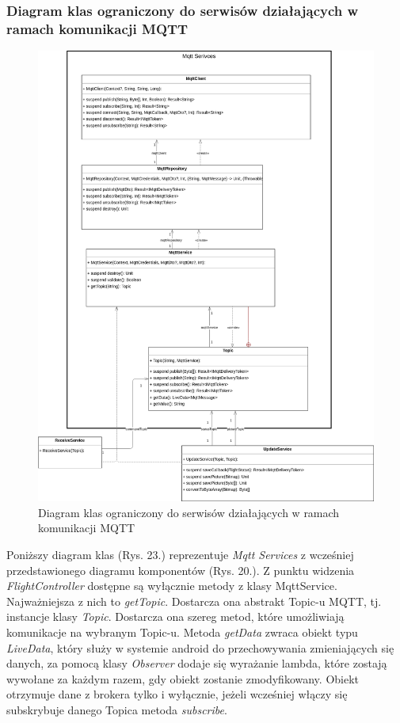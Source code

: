 \newpage

\subsubsection{Diagram klas ograniczony do serwisów działających w ramach komunikacji MQTT}

\begin{figure}[!htp]
  \centering
  \includegraphics[width=16cm]{./Obrazy/services.png}
  \caption{Diagram klas ograniczony do serwisów działających w ramach komunikacji MQTT}
  \end{figure}

  Poniższy diagram klas (Rys. 23.) reprezentuje \textit{Mqtt Services} z wcześniej przedstawionego diagramu komponentów (Rys. 20.). Z punktu widzenia \textit{FlightController} dostępne są wyłącznie metody z klasy MqttService. Najważniejsza z nich to \textit{getTopic}. Dostarcza ona abstrakt Topic-u MQTT, tj. instancje klasy \textit{Topic}. Dostarcza ona szereg metod, które umożliwiają komunikacje na wybranym Topic-u. Metoda \textit{getData} zwraca obiekt typu \textit{LiveData}, który służy w systemie android do przechowywania zmieniających się danych, za pomocą klasy \textit{Observer} dodaje się wyrażanie lambda, które zostają wywołane za każdym razem, gdy obiekt zostanie zmodyfikowany. Obiekt otrzymuje dane z brokera tylko i wyłącznie, jeżeli wcześniej włączy się subskrybuje danego Topica metoda \textit{subscribe}.


